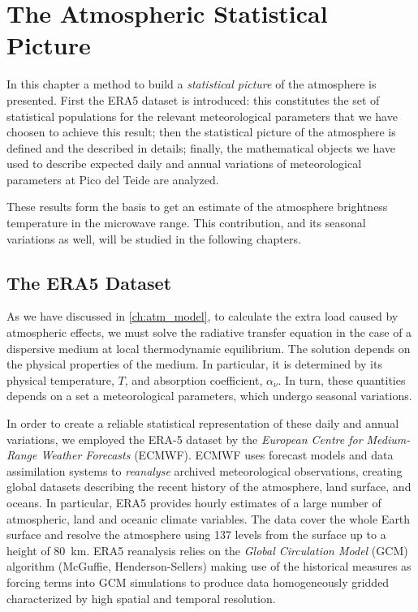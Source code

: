\chapter{The Atmospheric Statistical Picture}\label{ch:statistical_picture}

In this chapter a method to build a \emph{statistical picture} of the
atmosphere is presented. First the ERA5 dataset is introduced: this
constitutes the set of statistical populations for the relevant meteorological
parameters that we have choosen to achieve this result; then the statistical
picture of the atmosphere is defined and the described in details; finally,
the mathematical objects we have used to describe expected daily and annual
variations of meteorological parameters at Pico del Teide are analyzed.

These results form the basis to get an estimate of the atmosphere
brightness temperature in the microwave range. This contribution, and its
seasonal variations as well, will be studied in the following chapters.

\section{The ERA5 Dataset}

As we have discussed in \autoref{ch:atm_model}, to calculate the extra load
caused by atmospheric effects, we must solve the radiative transfer equation
in the case of a dispersive medium at local thermodynamic equilibrium. The
solution depends on the physical properties of the medium. In particular,
it is determined by its physical temperature, $T$, and absorption
coefficient, $\alpha_\nu$. In turn, these quantities depends on a set a
meteorological parameters, which undergo seasonal variations.

In order to create a reliable statistical representation of these daily and
annual variations, we employed the ERA-5 dataset by the \emph{European
Centre for Medium-Range Weather Forecasts} (ECMWF). ECMWF uses forecast
models and data assimilation systems to \emph{reanalyse} archived
meteorological observations, creating global datasets describing the
recent history of the atmosphere, land surface, and oceans. In particular,
ERA5 provides hourly estimates of a large number of atmospheric, land and
oceanic climate variables. The data cover the whole Earth surface and
resolve the atmosphere using \num{137} levels from the surface up to a
height of \SI{80}{\kilo\meter}. ERA5 reanalysis relies on the \emph{Global
Circulation Model} (GCM) algorithm (McGuffie, Henderson-Sellers) making use
of the historical measures as forcing terms into GCM simulations to produce
data homogeneously gridded characterized by high spatial and temporal
resolution.


